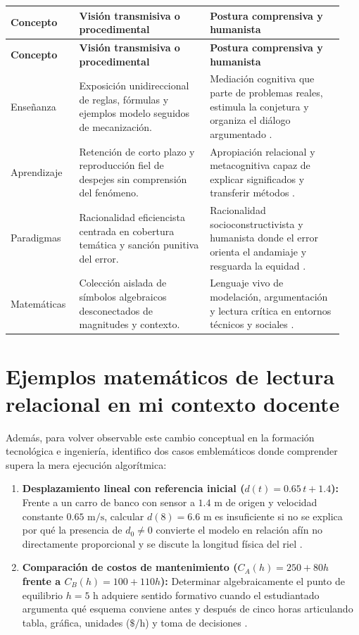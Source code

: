 \documentclass[spanish,letterpaper,oneside]{article}
\begin{document}
{\small{}\renewcommand{\arraystretch}{1.35}
\begin{longtable}{|>{\raggedright\arraybackslash}p{0.19\linewidth}|>{\raggedright\arraybackslash}p{0.37\linewidth}|>{\raggedright\arraybackslash}p{0.38\linewidth}|}\hline
\rowcolor{iiiepePale} \textbf{Concepto} & \textbf{Visión transmisiva o procedimental} & \textbf{Postura comprensiva y humanista} \\\hline
\endfirsthead
\hline
\rowcolor{iiiepePale} \textbf{Concepto} & \textbf{Visión transmisiva o procedimental} & \textbf{Postura comprensiva y humanista} \\\hline
\endhead
Enseñanza & Exposición unidireccional de reglas, fórmulas y ejemplos modelo seguidos de mecanización. & Mediación cognitiva que parte de problemas reales, estimula la conjetura y organiza el diálogo argumentado \citep{sawyer2008optimizing}. \\\hline
Aprendizaje & Retención de corto plazo y reproducción fiel de despejes sin comprensión del fenómeno. & Apropiación relacional y metacognitiva capaz de explicar significados y transferir métodos \citep{scott2015futuro}. \\\hline
Paradigmas & Racionalidad eficiencista centrada en cobertura temática y sanción punitiva del error. & Racionalidad socioconstructivista y humanista donde el error orienta el andamiaje y resguarda la equidad \citep{unesco2015replantear}. \\\hline
Matemáticas & Colección aislada de símbolos algebraicos desconectados de magnitudes y contexto. & Lenguaje vivo de modelación, argumentación y lectura crítica en entornos técnicos y sociales \citep{sep2023pensamiento}. \\\hline
\end{longtable}}

\section{Ejemplos matemáticos de lectura relacional en mi contexto docente}
Además, para volver observable este cambio conceptual en la formación tecnológica e ingeniería, identifico dos casos emblemáticos donde comprender supera la mera ejecución algorítmica:
\begin{enumerate}
  \item \textbf{Desplazamiento lineal con referencia inicial ($d(t) = 0.65\,t + 1.4$):} Frente a un carro de banco con sensor a $1.4\text{ m}$ de origen y velocidad constante $0.65\text{ m/s}$, calcular $d(8)=6.6\text{ m}$ es insuficiente si no se explica por qué la presencia de $d_0 \neq 0$ convierte el modelo en relación afín no directamente proporcional y se discute la longitud física del riel \citep{conalep2025mecatronica}.
  \item \textbf{Comparación de costos de mantenimiento ($C_A(h)=250+80h$ frente a $C_B(h)=100+110h$):} Determinar algebraicamente el punto de equilibrio $h=5\text{ h}$ adquiere sentido formativo cuando el estudiantado argumenta qué esquema conviene antes y después de cinco horas articulando tabla, gráfica, unidades ($\text{\$}/\text{h}$) y toma de decisiones \citep{star2015algebra}.
\end{enumerate}
\end{document}
